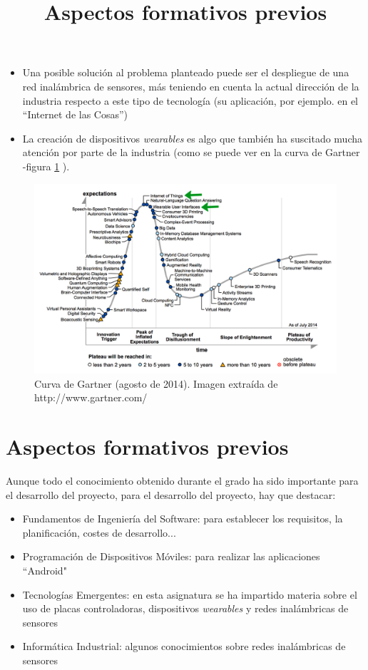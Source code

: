   \begin{itemize}
    \item Una posible solución al problema planteado puede ser el despliegue de una red inalámbrica de sensores,
    más teniendo en cuenta la actual dirección de la industria respecto a este tipo de tecnología (su aplicación,
    por ejemplo. en el “Internet de las Cosas”)
    \item La creación de dispositivos \textit{wearables} es algo que también ha suscitado mucha atención por parte de la industria
    (como se puede ver en la curva de Gartner -figura \ref{fig:curvaG} ).
  \end{itemize}

  \begin{figure}[htb]
  \centering
  \includegraphics[width=1\textwidth]{./imagenes/gartner}
  \caption{Curva de Gartner (agosto de 2014). Imagen extraída de \scriptsize{http://www.gartner.com/} \cite{gartnercurve}} \label{fig:curvaG}
  \end{figure}


\title{Aspectos formativos previos}
\section{Aspectos formativos previos}

Aunque todo el conocimiento obtenido durante el grado ha sido importante para el desarrollo del proyecto,
para el desarrollo del proyecto, hay que destacar:
  \begin{itemize}
    \item Fundamentos de Ingeniería del Software: para establecer los requisitos,
    la planificación, costes de desarrollo...
    \item Programación de Dispositivos Móviles: para realizar las aplicaciones ``Android"
    \item Tecnologías Emergentes: en esta asignatura se ha impartido materia sobre el uso
    de placas controladoras, dispositivos \textit{wearables} y redes inalámbricas de sensores
    \item Informática Industrial: algunos conocimientos sobre redes inalámbricas de sensores
  \end{itemize}
